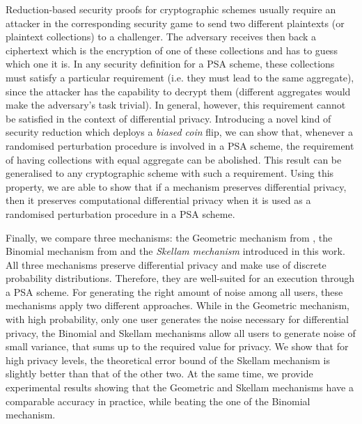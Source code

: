 \documentclass[10pt]{extarticle}
\begin{document}
Reduction-based security proofs for cryptographic schemes usually require an attacker in the corresponding security game to send two different plaintexts (or plaintext collections) to a challenger. The adversary receives then back a ciphertext which is the encryption of one of these collections and has to guess which one it is. In any security definition for a PSA scheme, these collections must satisfy a particular requirement (i.e. they must lead to the same aggregate), since the attacker has the capability to decrypt them (different aggregates would make the adversary's task trivial). In general, however, this requirement cannot be satisfied in the context of differential privacy. Introducing a novel kind of security reduction which deploys a \textit{biased coin} flip, we can show that, whenever a randomised perturbation procedure is involved in a PSA scheme, the requirement of having collections with equal aggregate can be abolished. This result can be generalised to any cryptographic scheme with such a requirement. Using this property, we are able to show that if a mechanism preserves differential privacy, then it preserves computational differential privacy when it is used as a randomised perturbation procedure in a PSA scheme.



Finally, we compare three mechanisms: the Geometric mechanism from \cite{2}, the Binomial mechanism from \cite{14} and the \textit{Skellam mechanism} introduced in this work. All three mechanisms preserve differential privacy and make use of discrete probability distributions. Therefore, they are well-suited for an execution through a PSA scheme. For generating the right amount of noise among all users, these mechanisms apply two different approaches. While in the Geometric mechanism, with high probability, only one user generates the noise necessary for differential privacy, the Binomial and Skellam mechanisms allow all users to generate noise of small variance, that sums up to the required value for privacy. We show that for high privacy levels, the theoretical error bound of the Skellam mechanism is slightly better than that of the other two. At the same time, we provide experimental results showing that the Geometric and Skellam mechanisms have a comparable accuracy in practice, while beating the one of the Binomial mechanism.\\
\end{document}
